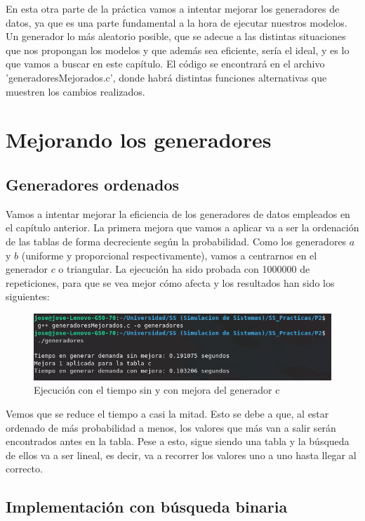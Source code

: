 \documentclass[11pt,a4paper]{report}
\begin{document}
En esta otra parte de la práctica vamos a intentar mejorar los generadores de datos, ya que es una parte fundamental a la hora de ejecutar nuestros modelos.
Un generador lo más aleatorio posible, que se adecue a las distintas situaciones que nos propongan los modelos y que además sea eficiente, sería el ideal, y 
es lo que vamos a buscar en este capítulo. El código se encontrará en el archivo 'generadoresMejorados.c', donde habrá distintas funciones alternativas que
muestren los cambios realizados.

\section{Mejorando los generadores}

\subsection{Generadores ordenados}

Vamos a intentar mejorar la eficiencia de los generadores de datos empleados en el capítulo anterior. La primera mejora que vamos a aplicar va a ser la ordenación
de las tablas de forma decreciente según la probabilidad. Como los generadores $a$ y $b$ (uniforme y proporcional respectivamente), vamos a centrarnos en el
generador $c$ o triangular. La ejecución ha sido probada con 1000000 de repeticiones, para que se vea mejor cómo afecta y los resultados han sido los siguientes:
\begin{figure}[H]
\centering
\includegraphics[scale=0.7]{img/mejora1.png}
\caption{Ejecución con el tiempo sin y con mejora del generador c}
\end{figure}

Vemos que se reduce el tiempo a casi la mitad. Esto se debe a que, al estar ordenado de más probabilidad a menos, los valores que más van a salir serán encontrados
antes en la tabla. Pese a esto, sigue siendo una tabla y la búsqueda de ellos va a ser lineal, es decir, va a recorrer los valores uno a uno hasta llegar al correcto.


\subsection{Implementación con búsqueda binaria}
\end{document}
